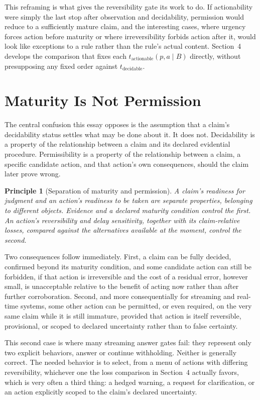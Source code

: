 \documentclass[11pt]{article}
\newtheorem{principle}{Principle}
\begin{document}
This reframing is what gives the reversibility gate its work to do. If actionability were simply the last stop after observation and decidability, permission would reduce to a sufficiently mature claim, and the interesting cases, where urgency forces action before maturity or where irreversibility forbids action after it, would look like exceptions to a rule rather than the rule's actual content. Section~4 develops the comparison that fixes each $t_{\mathrm{actionable}}(p,a\mid B)$ directly, without presupposing any fixed order against $t_{\mathrm{decidable}}$.

\section{Maturity Is Not Permission}

The central confusion this essay opposes is the assumption that a claim's decidability status settles what may be done about it. It does not. Decidability is a property of the relationship between a claim and its declared evidential procedure. Permissibility is a property of the relationship between a claim, a specific candidate action, and that action's own consequences, should the claim later prove wrong.

\begin{principle}[Separation of maturity and permission]
A claim's readiness for judgment and an action's readiness to be taken are separate properties, belonging to different objects. Evidence and a declared maturity condition control the first. An action's reversibility and delay sensitivity, together with its claim-relative losses, compared against the alternatives available at the moment, control the second.
\end{principle}

Two consequences follow immediately. First, a claim can be fully decided, confirmed beyond its maturity condition, and some candidate action can still be forbidden, if that action is irreversible and the cost of a residual error, however small, is unacceptable relative to the benefit of acting now rather than after further corroboration. Second, and more consequentially for streaming and real-time systems, some other action can be permitted, or even required, on the very same claim while it is still immature, provided that action is itself reversible, provisional, or scoped to declared uncertainty rather than to false certainty.

This second case is where many streaming answer gates fail: they represent only two explicit behaviors, answer or continue withholding. Neither is generally correct. The needed behavior is to select, from a menu of actions with differing reversibility, whichever one the loss comparison in Section~4 actually favors, which is very often a third thing: a hedged warning, a request for clarification, or an action explicitly scoped to the claim's declared uncertainty.
\end{document}
